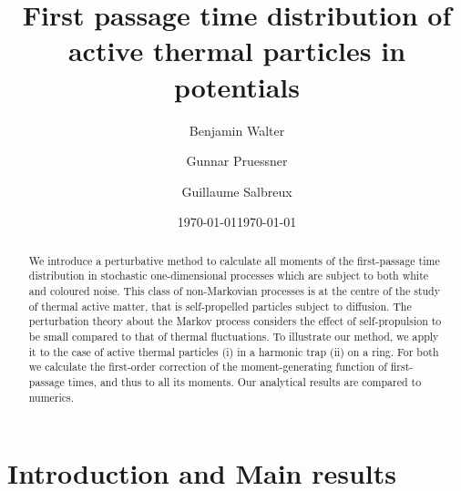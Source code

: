\documentclass[%
 reprint,
superscriptaddress,
nofootinbib,
 amsmath,amssymb,
 aps,
prx,
]{revtex4-2}
\begin{document}


\title{First passage time distribution of active thermal particles in potentials}

\author{Benjamin Walter}

\author{Gunnar Pruessner}
\author{ Guillaume Salbreux}
\date{\today}


\date{\today}

\begin{abstract}
We introduce a perturbative method to calculate all moments of the first-passage time distribution in stochastic one-dimensional processes which are subject 
to both white and coloured noise.  This class of non-Markovian processes is
at the centre of the study of 
thermal active matter, that is
self-propelled particles subject to diffusion. 
The perturbation theory about the Markov process
considers the effect
of self-propulsion to be small compared to that of thermal fluctuations. 
To illustrate our method, we apply it to the case of active thermal particles 
(i) in a harmonic trap
(ii) on a ring.
For both we calculate 
the first-order correction of the moment-generating function of first-passage times, and thus to all its moments. 
Our analytical results are compared to numerics.
\end{abstract}

\maketitle



\section{\label{sec:intro} Introduction and Main results}
\end{document}
